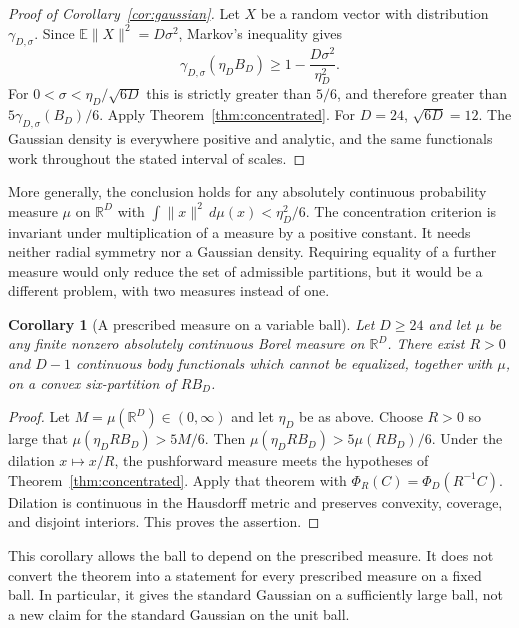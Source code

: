 \documentclass[a4paper,11pt,reqno]{amsart}
\newcommand{\R}{\mathbb R}
\newcommand{\dd}{\,d}
\newtheorem{corollary}[theorem]{Corollary}
\theoremstyle{definition}
\theoremstyle{remark}
\numberwithin{equation}{section}
\begin{document}
\begin{proof}[Proof of Corollary~\ref{cor:gaussian}]
Let $X$ be a random vector with distribution $\gamma_{D,\sigma}$.
Since $\mathbb E\|X\|^2=D\sigma^2$, Markov's inequality gives
\[
 \gamma_{D,\sigma}(\eta_D B_D)
 \ge 1-\frac{D\sigma^2}{\eta_D^2}.
\]
For $0<\sigma<\eta_D/\sqrt{6D}$ this is strictly greater than
$5/6$, and therefore greater than $5\gamma_{D,\sigma}(B_D)/6$.
Apply Theorem~\ref{thm:concentrated}. For $D=24$, $\sqrt{6D}=12$.
The Gaussian density is everywhere positive and analytic, and the
same functionals work throughout the stated interval of scales.
\end{proof}

More generally, the conclusion holds for any absolutely continuous
probability measure $\mu$ on $\R^D$ with $\int\|x\|^2\dd\mu(x)<\eta_D^2/6$.
The concentration criterion is invariant under multiplication of a
measure by a positive constant. It needs neither radial symmetry nor
a Gaussian density. Requiring equality of a further measure would
only reduce the set of admissible partitions, but it would be a
different problem, with two measures instead of one.

\begin{corollary}[A prescribed measure on a variable ball]\label{cor:prescribed}
Let $D\ge24$ and let $\mu$ be any finite nonzero absolutely continuous
Borel measure on $\R^D$. There exist $R>0$ and $D-1$ continuous
body functionals which cannot be equalized, together with $\mu$,
on a convex six-partition of $RB_D$.
\end{corollary}
\begin{proof}
Let $M=\mu(\R^D)\in(0,\infty)$ and let $\eta_D$ be as above.
Choose $R>0$ so large that $\mu(\eta_D RB_D)>5M/6$. Then
$\mu(\eta_D RB_D)>5\mu(RB_D)/6$. Under the dilation $x\mapsto x/R$,
the pushforward measure meets the hypotheses of
Theorem~\ref{thm:concentrated}. Apply that theorem with
$\Phi_R(C)=\Phi_D(R^{-1}C)$. Dilation is continuous in the
Hausdorff metric and preserves convexity, coverage, and disjoint
interiors. This proves the assertion.
\end{proof}
This corollary allows the ball to depend on the prescribed measure.
It does not convert the theorem into a statement for every prescribed
measure on a fixed ball. In particular, it gives the standard Gaussian
on a sufficiently large ball, not a new claim for the standard Gaussian
on the unit ball.
\end{document}
